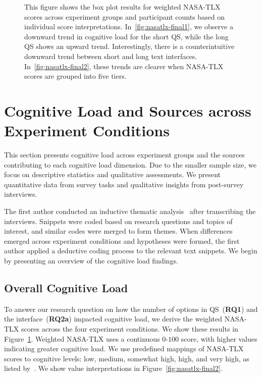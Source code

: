 \begin{figure}[htbp]
    \caption{This figure shows the box plot results for weighted NASA-TLX scores across experiment groups and participant counts based on individual score interpretations. In~\ref{fig:nasatlx-final1}, we observe a downward trend in cognitive load for the short QS, while the long QS shows an upward trend. Interestingly, there is a counterintuitive downward trend between short and long text interfaces. In~\ref{fig:nasatlx-final2}, these trends are clearer when NASA-TLX scores are grouped into five tiers.}
    \label{fig:nasatlx-final}
\end{figure}


\section{Cognitive Load and Sources across Experiment Conditions}
\label{sec:cog_result}
This section presents cognitive load across experiment groups and the sources contributing to each cognitive load dimension. Due to the smaller sample size, we focus on descriptive statistics and qualitative assessments. We present quantitative data from survey tasks and qualitative insights from post-survey interviews.

The first author conducted an inductive thematic analysis~\cite{olsonWaysKnowingHCI2014} after transcribing the interviews. Snippets were coded based on research questions and topics of interest, and similar codes were merged to form themes. When differences emerged across experiment conditions and hypotheses were formed, the first author applied a deductive coding process to the relevant text snippets. We begin by presenting an overview of the cognitive load findings. 

\subsection{Overall Cognitive Load}
\label{sec:cog}

To answer our research question on how the number of options in QS~(\textbf{RQ1}) and the interface~(\textbf{RQ2a}) impacted cognitive load, we derive the weighted NASA-TLX scores across the four experiment conditions. We show these results in Figure~\ref{fig:nasatlx-final}. Weighted NASA-TLX uses a continuous $0$-$100$ score, with higher values indicating greater cognitive load. We use predefined mappings of NASA-TLX scores to cognitive levels: low, medium, somewhat high, high, and very high, as listed by~\textcite{hart1988development}. We show value interpretations in Figure~\ref{fig:nasatlx-final2}. 

